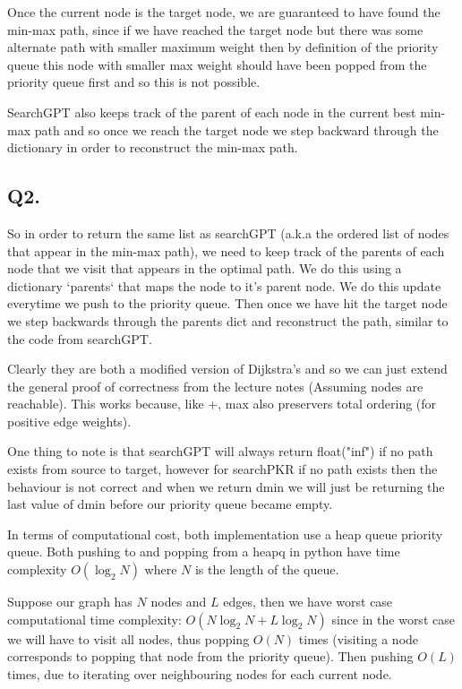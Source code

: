 \documentclass[a4paper, oneside]{book}
\begin{document}
Once the current node is the target node, we are guaranteed to have found the min-max path, since if we have reached the target node but there was some alternate path with
smaller maximum weight then by definition of the priority queue this node with smaller
max weight should have been popped from the priority queue first and so this is not possible.

SearchGPT also keeps track of the parent of each node in the current best min-max path
and so once we reach the target node we step backward through the dictionary in order to
reconstruct the min-max path.


\subsection*{Q2.}

So in order to return the same list as searchGPT (a.k.a the ordered list of nodes that
appear in the min-max path), we need to keep track of the parents of each node that we
visit that appears in the optimal path. We do this using a dictionary `parents` that maps
the node to it's parent node. We do this update everytime we push to the priority queue.
Then once we have hit the target node we step backwards through the parents dict
and reconstruct the path, similar to the code from searchGPT.

Clearly they are both a modified version of Dijkstra's and so we can just extend the general
proof of correctness from the lecture notes (Assuming nodes are reachable).
This works because, like +, max also preservers total ordering (for positive edge weights).

One thing to note is that searchGPT will always
return float("inf") if no path exists from source to target, however for searchPKR if no path
exists then the behaviour is not correct and when we return dmin we will just be returning
the last value of dmin before our priority queue became empty. 

 
In terms of computational cost, both implementation use a heap queue priority queue.
Both pushing to and popping from a heapq in python have time complexity $O(\log_{2}N)$ where 
$N$ is the length of the queue.

Suppose our graph has $N$ nodes and $L$ edges, then we have worst case computational time complexity: $O(N\log_{2}N + L \log_{2}N)$ since in the worst case we will have to visit all nodes, thus
popping $O(N)$ times (visiting a node corresponds to popping that node from the priority queue). Then pushing $O(L)$ times, due to iterating over neighbouring nodes for each current node.
\end{document}
